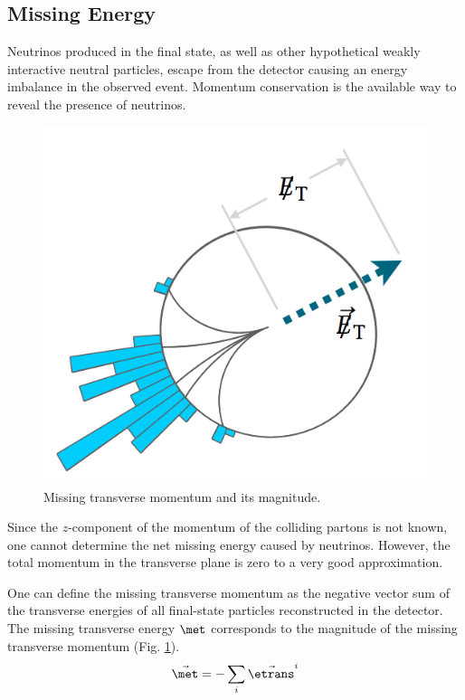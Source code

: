 \subsection{Missing Energy}

Neutrinos produced in the final state, as well as other hypothetical weakly interactive neutral particles, escape from the detector causing an energy imbalance in the observed event. Momentum conservation is the available way to reveal the presence of neutrinos. 

\begin{figure}[h]
\centering
\includegraphics[scale=0.4]{figures/experiment/metFig.png} 
\caption[Missing transverse momentum and its magnitude]{Missing transverse momentum and its magnitude.}
\label{missing}
\end{figure}


Since the $z$-component of the momentum of the colliding partons is not known, one cannot determine the net missing energy caused by neutrinos. However, the total momentum in the transverse plane is zero to a very good approximation. 

One can define the missing transverse momentum as the negative vector sum of the transverse energies of all final-state particles reconstructed in the detector. The missing transverse energy $\met$ corresponds to the magnitude of the missing transverse momentum (Fig. \ref{missing}).  
\begin{equation}
\vec{\met} = -\sum_i \vec{\etrans}^i
\end{equation} 


